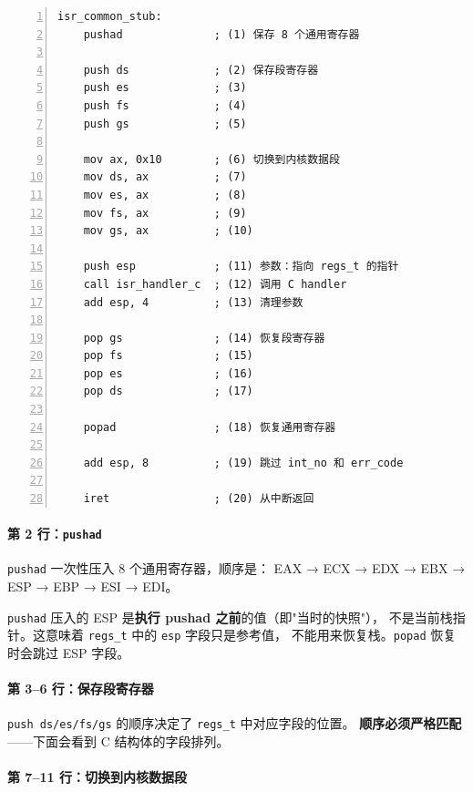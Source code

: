 \begin{lstlisting}[style=nasmstyle, numbers=left]
isr_common_stub:
    pushad              ; (1) 保存 8 个通用寄存器

    push ds             ; (2) 保存段寄存器
    push es             ; (3)
    push fs             ; (4)
    push gs             ; (5)

    mov ax, 0x10        ; (6) 切换到内核数据段
    mov ds, ax          ; (7)
    mov es, ax          ; (8)
    mov fs, ax          ; (9)
    mov gs, ax          ; (10)

    push esp            ; (11) 参数：指向 regs_t 的指针
    call isr_handler_c  ; (12) 调用 C handler
    add esp, 4          ; (13) 清理参数

    pop gs              ; (14) 恢复段寄存器
    pop fs              ; (15)
    pop es              ; (16)
    pop ds              ; (17)

    popad               ; (18) 恢复通用寄存器

    add esp, 8          ; (19) 跳过 int_no 和 err_code

    iret                ; (20) 从中断返回
\end{lstlisting}

\paragraph{第 2 行：\texttt{pushad}}

\texttt{pushad} 一次性压入 8 个通用寄存器，顺序是：
EAX → ECX → EDX → EBX → ESP → EBP → ESI → EDI。

\begin{warnbox}
\texttt{pushad} 压入的 ESP 是\textbf{执行 pushad 之前}的值（即"当时的快照"），
不是当前栈指针。这意味着 \texttt{regs\_t} 中的 \texttt{esp} 字段只是参考值，
不能用来恢复栈。\texttt{popad} 恢复时会跳过 ESP 字段。
\end{warnbox}

\paragraph{第 3--6 行：保存段寄存器}

\texttt{push ds/es/fs/gs} 的顺序决定了 \texttt{regs\_t} 中对应字段的位置。
\textbf{顺序必须严格匹配}——下面会看到 C 结构体的字段排列。

\paragraph{第 7--11 行：切换到内核数据段}

